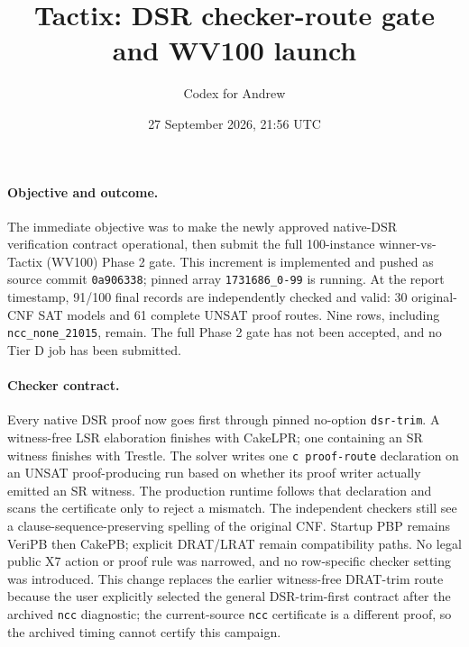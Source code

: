 \documentclass[11pt]{article}
\title{Tactix: DSR checker-route gate and WV100 launch}
\author{Codex for Andrew}
\date{27 September 2026, 21:56 UTC}
\begin{document}
\maketitle

\paragraph{Objective and outcome.}
The immediate objective was to make the newly approved native-DSR verification
contract operational, then submit the full 100-instance winner-vs-Tactix
(WV100) Phase 2 gate. This increment is implemented and pushed as source commit
\texttt{0a906338}; pinned array \texttt{1731686\_0-99} is running. At the
report timestamp, 91/100 final records are independently checked and valid:
30 original-CNF SAT models and 61 complete UNSAT proof routes. Nine rows,
including \texttt{ncc\_none\_21015}, remain. The full Phase 2 gate has not
been accepted, and no Tier D job has been submitted.

\paragraph{Checker contract.}
Every native DSR proof now goes first through pinned no-option
\texttt{dsr-trim}. A witness-free LSR elaboration finishes with CakeLPR;
one containing an SR witness finishes with Trestle. The solver writes one
\texttt{c proof-route} declaration on an UNSAT proof-producing run based on
whether its proof writer actually emitted an SR witness. The production
runtime follows that declaration and scans the certificate only to reject a
mismatch. The independent checkers still see a clause-sequence-preserving
spelling of the original CNF. Startup PBP remains VeriPB then CakePB; explicit
DRAT/LRAT remain compatibility paths. No legal public X7 action or proof rule
was narrowed, and no row-specific checker setting was introduced. This change
replaces the earlier witness-free DRAT-trim route because the user explicitly
selected the general DSR-trim-first contract after the archived \texttt{ncc}
diagnostic; the current-source \texttt{ncc} certificate is a different proof,
so the archived timing cannot certify this campaign.
\end{document}
